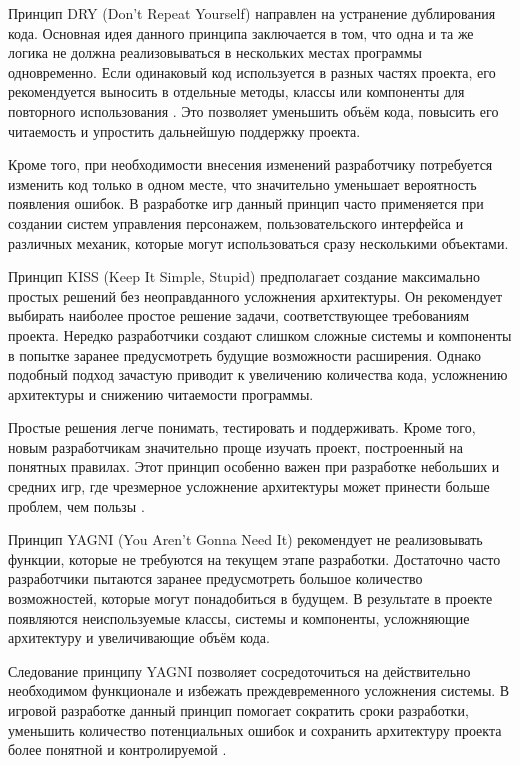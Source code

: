 \documentclass[a4paper,12pt]{report}
\begin{document}
Принцип \acrshort{DRY} (Don't Repeat Yourself) направлен на устранение дублирования кода. Основная идея данного принципа заключается в том, что одна и та же логика не должна реализовываться в нескольких местах программы одновременно. Если одинаковый код используется в разных частях проекта, его рекомендуется выносить в отдельные методы, классы или компоненты для повторного использования \cite{lin_style_guide}. Это позволяет уменьшить объём кода, повысить его читаемость и упростить дальнейшую поддержку проекта.

Кроме того, при необходимости внесения изменений разработчику потребуется изменить код только в одном месте, что значительно уменьшает вероятность появления ошибок. В разработке игр данный принцип часто применяется при создании систем управления персонажем, пользовательского интерфейса и различных механик, которые могут использоваться сразу несколькими объектами.

Принцип \acrshort{KISS} (Keep It Simple, Stupid) предполагает создание максимально простых решений без неоправданного усложнения архитектуры. Он рекомендует выбирать наиболее простое решение задачи, соответствующее требованиям проекта. Нередко разработчики создают слишком сложные системы и компоненты в попытке заранее предусмотреть будущие возможности расширения. Однако подобный подход зачастую приводит к увеличению количества кода, усложнению архитектуры и снижению читаемости программы.

Простые решения легче понимать, тестировать и поддерживать. Кроме того, новым разработчикам значительно проще изучать проект, построенный на понятных правилах. Этот принцип особенно важен при разработке небольших и средних игр, где чрезмерное усложнение архитектуры может принести больше проблем, чем пользы \cite{lin_style_guide}.

Принцип \acrshort{YAGNI} (You Aren't Gonna Need It) рекомендует не реализовывать функции, которые не требуются на текущем этапе разработки. Достаточно часто разработчики пытаются заранее предусмотреть большое количество возможностей, которые могут понадобиться в будущем. В результате в проекте появляются неиспользуемые классы, системы и компоненты, усложняющие архитектуру и увеличивающие объём кода.

Следование принципу \acrshort{YAGNI} позволяет сосредоточиться на действительно необходимом функционале и избежать преждевременного усложнения системы. В игровой разработке данный принцип помогает сократить сроки разработки, уменьшить количество потенциальных ошибок и сохранить архитектуру проекта более понятной и контролируемой \cite{lin_style_guide}.
\end{document}
